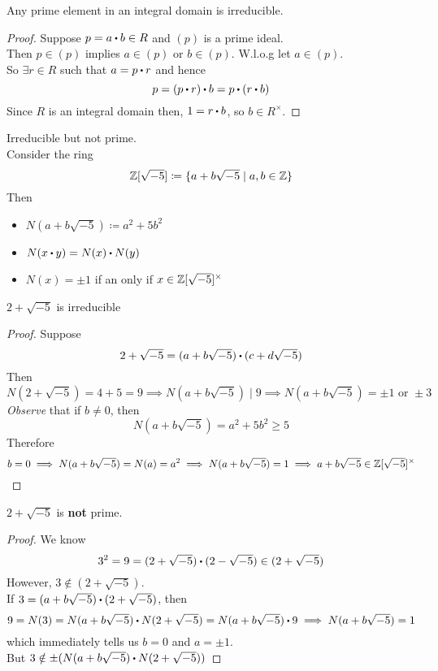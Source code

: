 \documentclass[../Main.tex]{subfiles}
\begin{document}
\begin{prop}
	Any prime element in an integral domain is irreducible.
\end{prop}
\begin{proof}
	Suppose $p=a\rdot b\in R$ and $(p)$ is a prime ideal.\\
	Then $p\in (p)$ implies $a\in (p)$ or $b\in (p)$. W.l.o.g let $a\in (p)$.\\
	So $\exists r\in R$ such that $a=p\rdot r$ and hence
	\[p=(p\rdot r)\rdot b=p\rdot (r\rdot b)\]
	Since $R$ is an integral domain then, $1=r\rdot b$, so $b\in R^\times $.
\end{proof}
\begin{example}
	Irreducible but not prime.\\
	Consider the ring 
	\[\mathbb{Z}[\sqrt{-5}] \coloneq \{a+b\sqrt{-5}\mid a,b\in \mathbb{Z}\} \]
	Then
	\begin{itemize}
		\item $N(a+b\sqrt{-5}) \coloneqq a^2+5b^2$
		\item $N(x\rdot y)=N(x)\rdot N(y)$
		\item $N(x)=\pm 1$ if an only if $x\in \mathbb{Z}[\sqrt{-5}]^\times$
	\end{itemize}
\end{example}
\begin{claim}
	$2+\sqrt{-5}$ is irreducible
\end{claim}
\begin{proof}
	Suppose 
	\[2+\sqrt{-5}=(a+b\sqrt{-5})\rdot (c+d\sqrt{-5})\]
	Then
	\[N(2+\sqrt{-5}) = 4+5 =9 \implies N(a+b\sqrt{-5})\mid 9 \implies N(a+b\sqrt{-5}) = \pm 1 \text{ or } \pm 3\]
	\textit{Observe} that if $b\ne 0$, then \[N(a+b\sqrt{-5}) = a^2+5b^2\ge 5\]
	Therefore
	\[b=0\implies N(a+b\sqrt{-5})=N(a)=a^2\implies N(a+b\sqrt{-5})=1\implies a+b\sqrt{-5}\in \mathbb{Z}[\sqrt{-5}]^\times\]
\end{proof}
\begin{claim}
	$2+\sqrt{-5}$ is \textbf{not} prime.
\end{claim}
\begin{proof}
	We know
	\[3^2=9=(2+\sqrt{-5})\rdot (2-\sqrt{-5}) \in (2+\sqrt{-5})\]
	However, $3\notin (2+\sqrt{-5})$.\\
	If $3=(a+b\sqrt{-5})\rdot (2+\sqrt{-5})$, then 
	\[9=N(3)=N(a+b\sqrt{-5})\rdot N(2+\sqrt{-5}) =N(a+b\sqrt{-5})\rdot 9 \implies N(a+b\sqrt{-5}) =1 \]
	which immediately tells us $b=0$ and $a=\pm 1$.\\
	But $3\notin \pm (N(a+b\sqrt{-5})\rdot N(2+\sqrt{-5}))$
\end{proof}
\end{document}
